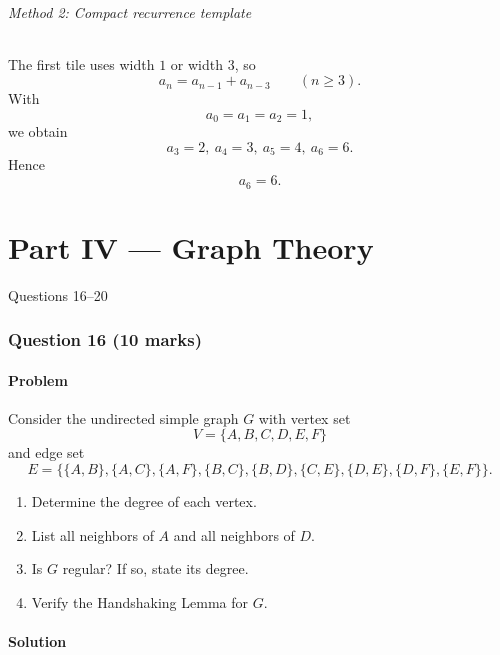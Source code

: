 \documentclass[12pt]{article}
\begin{document}
\paragraph{Method 2: Compact recurrence template}

The first tile uses width $1$ or width $3$, so
\[
a_n=a_{n-1}+a_{n-3}\qquad (n\ge 3).
\]
With
\[
a_0=a_1=a_2=1,
\]
we obtain
\[
a_3=2,\ a_4=3,\ a_5=4,\ a_6=6.
\]
Hence
\[
\boxed{a_6=6.}
\]

\newpage
\part{Part  IV --- Graph Theory}
Questions 16--20

\newpage
\section{Question 16 \hfill (10 marks)}
\subsection{Problem}

Consider the undirected simple graph $G$ with vertex set
\[
V=\{A,B,C,D,E,F\}
\]
and edge set
\[
E=\bigl\{\{A,B\},\{A,C\},\{A,F\},\{B,C\},\{B,D\},\{C,E\},\{D,E\},\{D,F\},\{E,F\}\bigr\}.
\]

\begin{enumerate}[label=(\alph*)]
    \item Determine the degree of each vertex.
    \item List all neighbors of $A$ and all neighbors of $D$.
    \item Is $G$ regular? If so, state its degree.
    \item Verify the Handshaking Lemma for $G$.
\end{enumerate}

\subsection{Solution}
\end{document}
